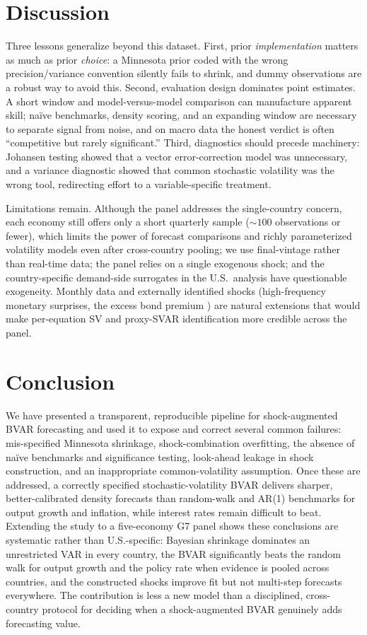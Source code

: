 \documentclass[conference]{IEEEtran}
\begin{document}
\section{Discussion}
Three lessons generalize beyond this dataset. First, prior \emph{implementation}
matters as much as prior \emph{choice}: a Minnesota prior coded with the wrong
precision/variance convention silently fails to shrink, and dummy observations
are a robust way to avoid this. Second, evaluation design dominates point
estimates. A short window and model-versus-model comparison can manufacture
apparent skill; na\"ive benchmarks, density scoring, and an expanding window are
necessary to separate signal from noise, and on macro data the honest verdict is
often ``competitive but rarely significant.'' Third, diagnostics should precede
machinery: Johansen testing showed that a vector error-correction model was
unnecessary, and a variance diagnostic showed that common stochastic volatility
was the wrong tool, redirecting effort to a variable-specific treatment.

Limitations remain. Although the panel addresses the single-country concern, each
economy still offers only a short quarterly sample ($\sim\!100$ observations or
fewer), which limits the power of forecast comparisons and richly parameterized
volatility models even after cross-country pooling; we use final-vintage rather
than real-time data; the panel relies on a single exogenous shock; and the
country-specific demand-side surrogates in the U.S.\ analysis have questionable
exogeneity. Monthly data and externally identified shocks (high-frequency monetary
surprises, the excess bond premium \cite{gz2012,gss2005}) are natural extensions
that would make per-equation SV and proxy-SVAR identification more credible across
the panel.

\section{Conclusion}
We have presented a transparent, reproducible pipeline for shock-augmented BVAR
forecasting and used it to expose and correct several common failures:
mis-specified Minnesota shrinkage, shock-combination overfitting, the absence of
na\"ive benchmarks and significance testing, look-ahead leakage in shock
construction, and an inappropriate common-volatility assumption. Once these are
addressed, a correctly specified stochastic-volatility BVAR delivers sharper,
better-calibrated density forecasts than random-walk and AR(1) benchmarks for
output growth and inflation, while interest rates remain difficult to beat.
Extending the study to a five-economy G7 panel shows these conclusions are
systematic rather than U.S.-specific: Bayesian shrinkage dominates an unrestricted
VAR in every country, the BVAR significantly beats the random walk for output
growth and the policy rate when evidence is pooled across countries, and the
constructed shocks improve fit but not multi-step forecasts everywhere. The
contribution is less a new model than a disciplined, cross-country protocol for
deciding when a shock-augmented BVAR genuinely adds forecasting value.
\end{document}
